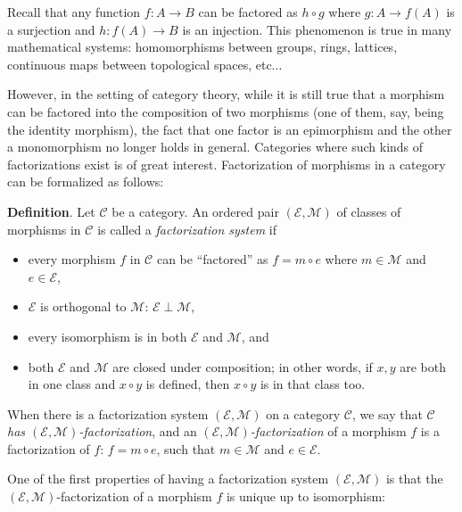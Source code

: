 \documentclass[12pt]{article}
\begin{document}
Recall that any function $f:A\to B$ can be factored as $h\circ g$ where $g:A\to f(A)$ is a surjection and $h:f(A)\to B$ is an injection.  This phenomenon is true in many mathematical systems: homomorphisms between groups, rings, lattices, continuous maps between topological spaces, etc... 

However, in the setting of category theory, while it is still true that a morphism can be factored into the composition of two morphisms (one of them, say, being the identity morphism), the fact that one factor is an epimorphism and the other a monomorphism no longer holds in general.  Categories where such kinds of factorizations exist is of great interest.  Factorization of morphisms in a category can be formalized as follows:

\textbf{Definition}.  Let $\mathcal{C}$ be a category.  An ordered pair $(\mathcal{E},\mathcal{M})$ of classes of morphisms in $\mathcal{C}$ is called a \emph{factorization system} if 
\begin{itemize}
\item every morphism $f$ in $\mathcal{C}$ can be ``factored'' as $f=m\circ e$ where $m\in \mathcal{M}$ and $e\in \mathcal{E}$,
\item $\mathcal{E}$ is orthogonal to $\mathcal{M}$: $\mathcal{E} \perp \mathcal{M}$,
\item every isomorphism is in both $\mathcal{E}$ and $\mathcal{M}$, and
\item both $\mathcal{E}$ and $\mathcal{M}$ are closed under composition; in other words, if $x,y$ are both in one class and $x\circ y$ is defined, then $x\circ y$ is in that class too.
\end{itemize}
When there is a factorization system $(\mathcal{E},\mathcal{M})$ on a category $\mathcal{C}$, we say that $\mathcal{C}$ \emph{has $(\mathcal{E},\mathcal{M})$-factorization}, and an \emph{$(\mathcal{E},\mathcal{M})$-factorization} of a morphism $f$ is a factorization of $f$: $f=m\circ e$, such that $m\in \mathcal{M}$ and $e\in \mathcal{E}$.

One of the first properties of having a factorization system $(\mathcal{E},\mathcal{M})$ is that the $(\mathcal{E},\mathcal{M})$-factorization of a morphism $f$ is unique up to isomorphism:
\end{document}
